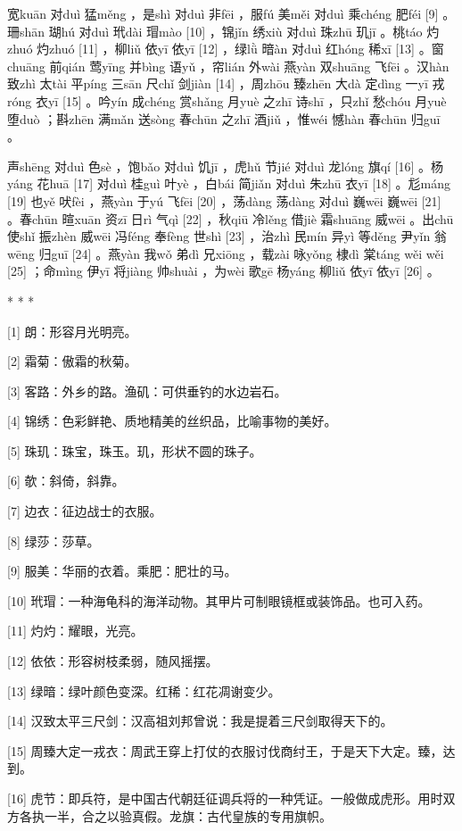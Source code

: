 \documentclass[12pt,UTF8]{ctexbook}
\begin{document}
宽kuān 对duì 猛měng ，是shì 对duì 非fēi ，服fú 美měi 对duì 乘chéng 肥féi [9] 。珊shān 瑚hú 对duì 玳dài 瑁mào [10] ，锦jǐn 绣xiù 对duì 珠zhū 玑jī 。桃táo 灼zhuó 灼zhuó [11] ，柳liǔ 依yī 依yī [12] ，绿lǜ 暗àn 对duì 红hóng 稀xī [13] 。窗chuāng 前qián 莺yīng 并bìng 语yǔ ，帘lián 外wài 燕yàn 双shuāng 飞fēi 。汉hàn 致zhì 太tài 平píng 三sān 尺chǐ 剑jiàn [14] ，周zhōu 臻zhēn 大dà 定dìng 一yī 戎róng 衣yī [15] 。吟yín 成chéng 赏shǎng 月yuè 之zhī 诗shī ，只zhǐ 愁chóu 月yuè 堕duò ；斟zhēn 满mǎn 送sòng 春chūn 之zhī 酒jiǔ ，惟wéi 憾hàn 春chūn 归guī 。

声shēng 对duì 色sè ，饱bǎo 对duì 饥jī ，虎hǔ 节jié 对duì 龙lóng 旗qí [16] 。杨yáng 花huā [17] 对duì 桂guì 叶yè ，白bái 简jiǎn 对duì 朱zhū 衣yī [18] 。尨máng [19] 也yě 吠fèi ，燕yàn 于yú 飞fēi [20] ，荡dàng 荡dàng 对duì 巍wēi 巍wēi [21] 。春chūn 暄xuān 资zī 日rì 气qì [22] ，秋qiū 冷lěng 借jiè 霜shuāng 威wēi 。出chū 使shǐ 振zhèn 威wēi 冯féng 奉fèng 世shì [23] ，治zhì 民mín 异yì 等děng 尹yǐn 翁wēng 归guī [24] 。燕yàn 我wǒ 弟dì 兄xiōng ，载zài 咏yǒng 棣dì 棠táng wěi wěi [25] ；命mìng 伊yī 将jiàng 帅shuài ，为wèi 歌gē 杨yáng 柳liǔ 依yī 依yī [26] 。



* * *



[1] 朗：形容月光明亮。

[2] 霜菊：傲霜的秋菊。

[3] 客路：外乡的路。渔矶：可供垂钓的水边岩石。

[4] 锦绣：色彩鲜艳、质地精美的丝织品，比喻事物的美好。

[5] 珠玑：珠宝，珠玉。玑，形状不圆的珠子。

[6] 欹：斜倚，斜靠。

[7] 边衣：征边战士的衣服。

[8] 绿莎：莎草。

[9] 服美：华丽的衣着。乘肥：肥壮的马。

[10] 玳瑁：一种海龟科的海洋动物。其甲片可制眼镜框或装饰品。也可入药。

[11] 灼灼：耀眼，光亮。

[12] 依依：形容树枝柔弱，随风摇摆。

[13] 绿暗：绿叶颜色变深。红稀：红花凋谢变少。

[14] 汉致太平三尺剑：汉高祖刘邦曾说：我是提着三尺剑取得天下的。

[15] 周臻大定一戎衣：周武王穿上打仗的衣服讨伐商纣王，于是天下大定。臻，达到。

[16] 虎节：即兵符，是中国古代朝廷征调兵将的一种凭证。一般做成虎形。用时双方各执一半，合之以验真假。龙旗：古代皇族的专用旗帜。
\end{document}
